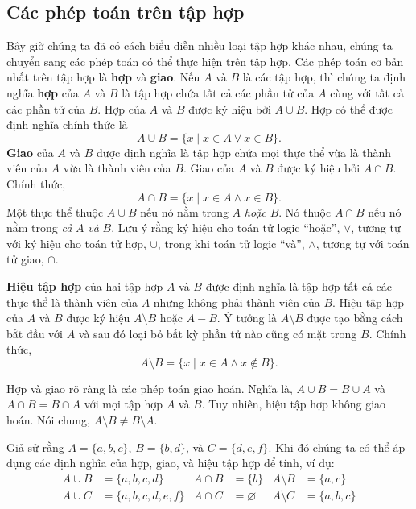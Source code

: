 \subsection{Các phép toán trên tập hợp}

Bây giờ chúng ta đã có cách biểu diễn nhiều loại tập hợp khác nhau, chúng ta chuyển sang các phép toán có thể thực hiện trên tập hợp. Các phép toán cơ bản nhất trên tập hợp là \textbf{hợp} và \textbf{giao}. Nếu $A$ và $B$ là các tập hợp, thì chúng ta định nghĩa \textbf{hợp} của $A$ và $B$ là tập hợp chứa tất cả các phần tử của $A$ cùng với tất cả các phần tử của $B$. Hợp của $A$ và $B$ được ký hiệu bởi $A \cup B$. Hợp có thể được định nghĩa chính thức là
\[
A \cup B = \{x \mid x \in A \lor x \in B\}.
\]
\textbf{Giao} của $A$ và $B$ được định nghĩa là tập hợp chứa mọi thực thể vừa là thành viên của $A$ vừa là thành viên của $B$. Giao của $A$ và $B$ được ký hiệu bởi $A \cap B$. Chính thức,
\[
A \cap B = \{x \mid x \in A \land x \in B\}.
\]
Một thực thể thuộc $A \cup B$ nếu nó nằm trong $A$ \textit{hoặc} $B$. Nó thuộc $A \cap B$ nếu nó nằm trong \textit{cả} $A$ \textit{và} $B$. Lưu ý rằng ký hiệu cho toán tử logic ``hoặc'', $\lor$, tương tự với ký hiệu cho toán tử hợp, $\cup$, trong khi toán tử logic ``và'', $\land$, tương tự với toán tử giao, $\cap$.

\textbf{Hiệu tập hợp} của hai tập hợp $A$ và $B$ được định nghĩa là tập hợp tất cả các thực thể là thành viên của $A$ nhưng không phải thành viên của $B$. Hiệu tập hợp của $A$ và $B$ được ký hiệu $A \setminus B$ hoặc $A - B$. Ý tưởng là $A \setminus B$ được tạo bằng cách bắt đầu với $A$ và sau đó loại bỏ bất kỳ phần tử nào cũng có mặt trong $B$. Chính thức,
\[
A \setminus B = \{x \mid x \in A \land x \notin B\}.
\]

Hợp và giao rõ ràng là các phép toán giao hoán. Nghĩa là, $A \cup B = B \cup A$ và $A \cap B = B \cap A$ với mọi tập hợp $A$ và $B$. Tuy nhiên, hiệu tập hợp không giao hoán. Nói chung, $A \setminus B \neq B \setminus A$.

\begin{example}
Giả sử rằng $A = \{a, b, c\}$, $B = \{b, d\}$, và $C = \{d, e, f\}$. Khi đó chúng ta có thể áp dụng các định nghĩa của hợp, giao, và hiệu tập hợp để tính, ví dụ:
\begin{align*}
A \cup B &= \{a, b, c, d\}  &  A \cap B &= \{b\}  &  A \setminus B &= \{a, c\} \\
A \cup C &= \{a, b, c, d, e, f\}  &  A \cap C &= \varnothing  &  A \setminus C &= \{a, b, c\}
\end{align*}
\end{example}

